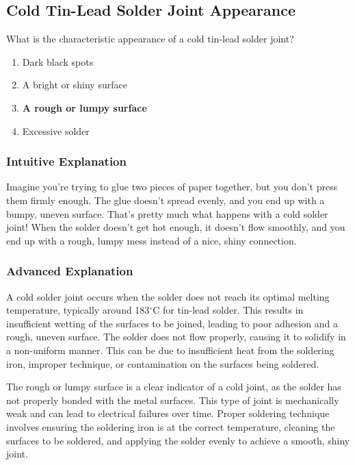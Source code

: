 \subsection{Cold Tin-Lead Solder Joint Appearance}
\label{T7D09}

\begin{tcolorbox}[colback=gray!10!white,colframe=black!75!black,title=T7D09]
What is the characteristic appearance of a cold tin-lead solder joint?
\begin{enumerate}[label=\Alph*]
    \item Dark black spots
    \item A bright or shiny surface
    \item \textbf{A rough or lumpy surface}
    \item Excessive solder
\end{enumerate}
\end{tcolorbox}

\subsubsection{Intuitive Explanation}
Imagine you're trying to glue two pieces of paper together, but you don't press them firmly enough. The glue doesn't spread evenly, and you end up with a bumpy, uneven surface. That's pretty much what happens with a cold solder joint! When the solder doesn't get hot enough, it doesn't flow smoothly, and you end up with a rough, lumpy mess instead of a nice, shiny connection.

\subsubsection{Advanced Explanation}
A cold solder joint occurs when the solder does not reach its optimal melting temperature, typically around 183$^\circ$C for tin-lead solder. This results in insufficient wetting of the surfaces to be joined, leading to poor adhesion and a rough, uneven surface. The solder does not flow properly, causing it to solidify in a non-uniform manner. This can be due to insufficient heat from the soldering iron, improper technique, or contamination on the surfaces being soldered. 

The rough or lumpy surface is a clear indicator of a cold joint, as the solder has not properly bonded with the metal surfaces. This type of joint is mechanically weak and can lead to electrical failures over time. Proper soldering technique involves ensuring the soldering iron is at the correct temperature, cleaning the surfaces to be soldered, and applying the solder evenly to achieve a smooth, shiny joint.

